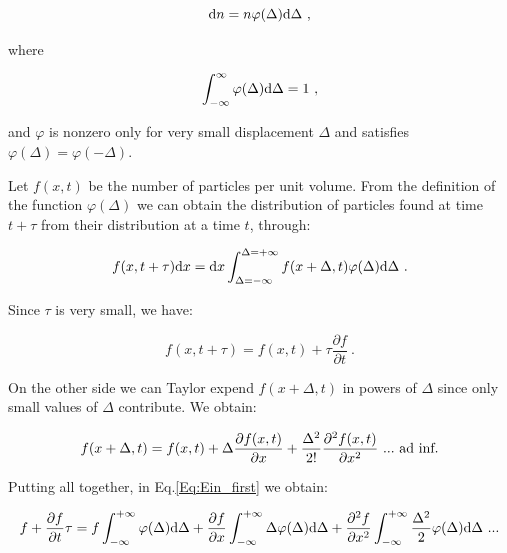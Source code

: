 \begin{equation}
	\textnormal{d}n = n\varphi(\Delta)\textnormal{d}\Delta ~,
\end{equation}

where

\begin{equation}
	\int_{-\infty} ^{\infty} \varphi (\Delta)\textnormal{d} \Delta = 1 ~,
	\label{Eq:ein_def_phi}
\end{equation}

and $\varphi$ is nonzero only for very small displacement $\Delta$ and satisfies $\varphi (\Delta) = \varphi (-\Delta)$.

Let $f(x,t)$ be the number of particles per unit volume. From the definition of the function $\varphi(\Delta)$ we can obtain the distribution of particles found at time $ t + \tau$ from their distribution at a time $t$, through:

\begin{equation}
	f(x, t+\tau)\textnormal{d}x = \textnormal{d}x\int_{\Delta = -\infty} ^{\Delta = +\infty} f(x+\Delta, t) \varphi (\Delta) \textnormal{d}\Delta ~.
	\label{Eq:Ein_first}
\end{equation}

Since $\tau$ is very small, we have:

\begin{equation}
	f(x, t+\tau) = f(x,t) + \tau \frac{\partial f}{\partial t} ~.
\end{equation}

On the other side we can Taylor expend $f(x+\Delta, t)$ in powers of $\Delta$ since only small values of $\Delta$ contribute. We obtain:

\begin{equation}
	f(x + \Delta, t) = f(x,t) + \Delta \frac{\partial f(x,t)}{\partial x} + \frac{\Delta ^2}{2!} \frac{\partial ^2 f(x,t)}{\partial x^2} ~... ~\textnormal{ad inf.}
\end{equation}

Putting all together, in Eq.\ref{Eq:Ein_first} we obtain:

\begin{equation}
	f + \frac{\partial f}{\partial t} \tau = f \int_{-\infty}^{+\infty} \varphi(\Delta)\textnormal{d} \Delta + \frac{\partial f}{\partial x} \int_{-\infty}^{+\infty} \Delta \varphi (\Delta)\textnormal{d} \Delta + \frac{\partial ^2 f}{\partial x^2} \int_{-\infty}^{+\infty} \frac{\Delta ^2}{2} \varphi(\Delta)\textnormal{d}\Delta ~...
	\label{Eq:ein_expended}
\end{equation}

